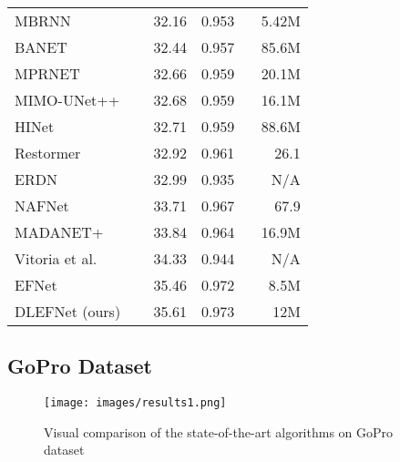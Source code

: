 \documentclass{article}
\begin{document}
\begin{table}
\begin{tabular}{lrrr}
MBRNN~\cite{MBRNN}         & \multicolumn{1}{l}{~ 32.16} & \multicolumn{1}{l}{0.953} & \multicolumn{1}{l}{~ 5.42M}    \\
BANET ~\cite{tsai2021banet}       & 32.44                       & 0.957                     & 85.6M                          \\
MPRNET~\cite{zamir2021multi}       & 32.66                       & 0.959                     & 20.1M                          \\
MIMO-UNet++~\cite{cho2021rethinking} & 32.68                       & 0.959                     & 16.1M                          \\
HINet~\cite{chen2021hinet}         & \multicolumn{1}{l}{~ 32.71} & \multicolumn{1}{l}{0.959} & \multicolumn{1}{l}{~ 88.6M}    \\
  Restormer~\cite{restormer}  & 32.92                       & 0.961                     & 26.1                            \\
ERDN~\cite{ERDN}         & 32.99                       & 0.935                     & N/A                            \\ 
  NAFNet~\cite{Nafnet}                   &33.71                        &0.967                      &67.9                            \\
{MADANET+}  ~\cite{MADANet}   & {33.84}                       & {0.964}                     & 16.9M                          \\
  Vitoria et al.~\cite{vitoria2022event}  & 34.33&0.944 &N/A\\
  EFNet~\cite{EFNet}& 35.46&0.972 &8.5M\\
  \midrule
  DLEFNet (ours) & 35.61& 0.973 &12M\\ 
\bottomrule
\end{tabular}
\end{table}
\subsection{GoPro Dataset}

\begin{figure*}[ht]
\centering
\texttt{[image: images/results1.png]}
\caption{Visual comparison of the state-of-the-art algorithms on GoPro dataset}
\label{fig:resultsGoPro}
\end{figure*}
\end{document}
